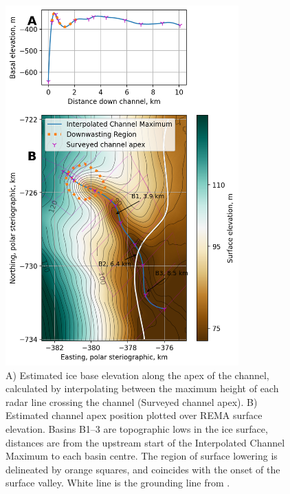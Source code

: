 \begin{figure}[!ht]
\centering
\includegraphics[width=0.8\textwidth]{chapters/2/thickness_surfacecolour.png}
\caption[Ice base profile]{A) Estimated ice base elevation along the apex of the channel, calculated by interpolating between the maximum height of each radar line crossing the channel (Surveyed channel apex). B) Estimated channel apex position plotted over REMA surface elevation. Basins B1--3 are topographic lows in the ice surface, distances are from the upstream start of the Interpolated Channel Maximum to each basin centre. The region of surface lowering is delineated by orange squares, and coincides with the onset of the surface valley. White line is the grounding line from \cite{depoorter2013amii}.}
\label{fig:thickness_surfacecolour}
\end{figure}  

